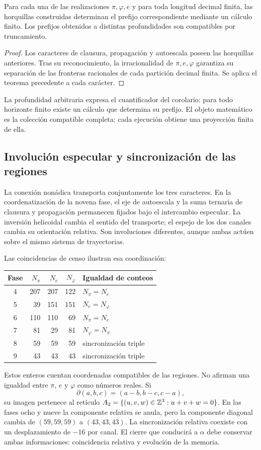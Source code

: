 \begin{corollary}
\label{gen:prefijos-regionales}
Para cada una de las realizaciones \(\pi,\varphi,e\) y para toda longitud
decimal finita, las horquillas construidas determinan el prefijo correspondiente
mediante un cálculo finito. Los prefijos obtenidos a distintas profundidades
son compatibles por truncamiento.
\end{corollary}
\begin{proof}
Los caracteres de clausura, propagación y autoescala poseen las horquillas
anteriores. Tras su reconocimiento, la irracionalidad de \(\pi,e,\varphi\)
garantiza su separación de las fronteras racionales de cada partición decimal
finita. Se aplica el teorema precedente a cada carácter.
\end{proof}
La profundidad arbitraria expresa el cuantificador del corolario: para todo
horizonte finito existe un cálculo que determina su prefijo. El objeto
matemático es la colección compatible completa; cada ejecución obtiene una
proyección finita de ella.

\subsection{Involución especular y sincronización de las regiones}

La conexión nonádica transporta conjuntamente los tres caracteres. En la coordenatización de la novena fase, el eje de autoescala y la suma ternaria de clausura y propagación permanecen fijados bajo el intercambio especular. La inversión helicoidal cambia el sentido del transporte; el espejo de los dos canales cambia su orientación relativa. Son involuciones diferentes, aunque ambas actúen sobre el mismo sistema de trayectorias.

Las coincidencias de censo ilustran esa coordinación:
\begin{center}
\begin{tabular}{@{}c rrr l@{}}\toprule
Fase&\(N_\pi\)&\(N_e\)&\(N_\varphi\)&Igualdad de conteos\\\midrule
4&207&207&122&\(N_\pi=N_e\)\\
5&39&151&151&\(N_e=N_\varphi\)\\
6&110&110&69&\(N_\pi=N_e\)\\
7&81&29&81&\(N_\varphi=N_\pi\)\\
8&59&59&59&sincronización triple\\
9&43&43&43&sincronización triple\\\bottomrule
\end{tabular}
\end{center}
Estos enteros cuentan coordenadas compatibles de las regiones. No afirman una igualdad entre \(\pi\), \(e\) y \(\varphi\) como números reales. Si
\[
 \partial(a,b,c)=(a-b,b-c,c-a),
\]
su imagen pertenece al retículo \(A_2=\{(u,v,w)\in\mathbb Z^3:u+v+w=0\}\). En las fases ocho y nueve la componente relativa se anula, pero la componente diagonal cambia de \((59,59,59)\) a \((43,43,43)\). La sincronización relativa coexiste con un desplazamiento de \(-16\) por canal. El cierre que conducirá a \(\alpha\) debe conservar ambas informaciones: coincidencia relativa y evolución de la memoria.

